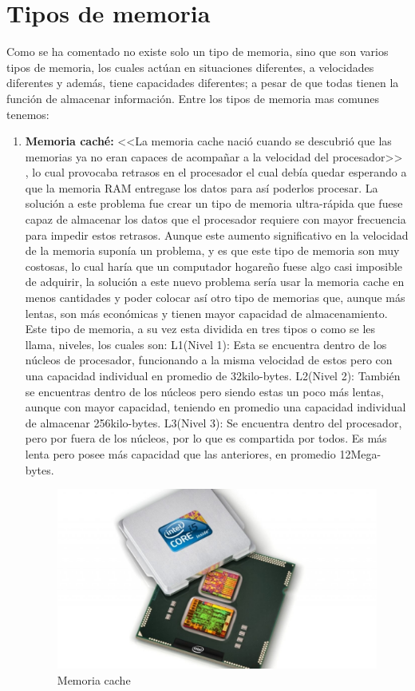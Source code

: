 \documentclass{article}
\begin{document}
\section{Tipos de memoria} \label{contenido}
Como se ha comentado no existe solo un tipo de memoria, sino que son varios tipos de memoria, los cuales actúan en situaciones diferentes, a velocidades diferentes y además, tiene capacidades diferentes; a pesar de que todas tienen la función de almacenar información. 
Entre los tipos de memoria mas comunes tenemos:
\begin{enumerate}
\item \textbf{Memoria caché:} <<La memoria cache nació cuando se descubrió que las memorias ya no eran capaces de acompañar a la velocidad del procesador>> \cite{tipos-memoria}, lo cual provocaba retrasos en el procesador el cual debía quedar esperando a que la memoria RAM entregase los datos para así poderlos procesar. La solución a este problema fue crear un tipo de memoria ultra-rápida que fuese capaz de almacenar los datos que el procesador requiere con mayor frecuencia para impedir estos retrasos.
Aunque este aumento significativo en la velocidad de la memoria suponía un problema, y es que este tipo de memoria son muy costosas, lo cual haría que un computador hogareño fuese algo casi imposible de adquirir, la solución a este nuevo problema sería usar la memoria cache en menos cantidades y poder colocar así otro tipo de memorias que, aunque más lentas, son más económicas y tienen mayor capacidad de almacenamiento. 
Este tipo de memoria, a su vez esta dividida en tres tipos o como se les llama, niveles, los cuales son:
\subitem L1(Nivel 1): Esta se encuentra dentro de los núcleos de procesador, funcionando a la misma velocidad de estos pero con una capacidad individual en promedio de 32kilo-bytes.
\subitem L2(Nivel 2): También se encuentras dentro de los núcleos pero siendo estas un poco más lentas, aunque con mayor capacidad, teniendo en promedio una capacidad individual de almacenar 256kilo-bytes.
\subitem L3(Nivel 3): Se encuentra dentro del procesador, pero por fuera de los núcleos, por lo que es compartida por todos. Es más lenta pero posee más capacidad que las anteriores, en promedio 12Mega-bytes. 
    \begin{figure}[h]
        \centering
        \includegraphics[scale=0.25]{Memoria cache.jpg}
        \caption{Memoria cache}
        \label{fig:memoriacachel}
    \end{figure}



\end{enumerate}
\end{document}
